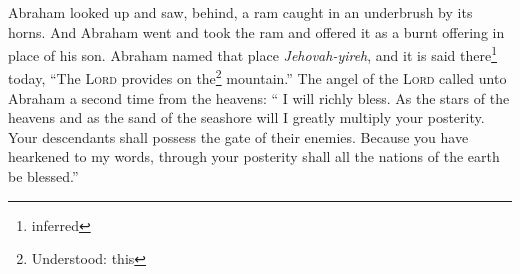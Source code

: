 \begin{enumerate}[align=center]
     Abraham looked up and saw, behind, a ram caught in an underbrush by its horns. And Abraham went and took the ram and offered it as a burnt offering in place of his son.%
     Abraham named that place \textit{Jehovah-yireh}, and it is said there\footnote{inferred} today, ``The \textsc{Lord} provides on the\footnote{Understood: this} mountain.''%
     The angel of the \textsc{Lord} called unto Abraham a second time from the heavens:%
     ``%
     I will richly bless. As the stars of the heavens and as the sand of the seashore will I greatly multiply your posterity. Your descendants shall possess the gate of their enemies.%
     Because you have hearkened to my words, through your posterity shall all the nations of the earth be blessed.''%
\end{enumerate}
